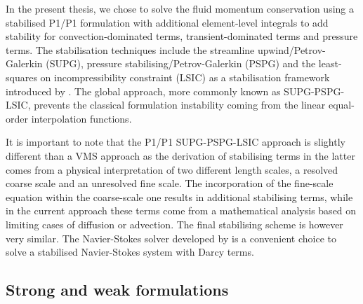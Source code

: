 In the present thesis, we chose to solve the fluid momentum conservation using a stabilised P1/P1 formulation with additional 
element-level integrals to add stability for convection-dominated terms, transient-dominated terms and pressure terms. 
The stabilisation techniques include the streamline upwind/Petrov-Galerkin (SUPG), pressure stabilising/Petrov-Galerkin (PSPG) and
the least-squares on incompressibility constraint (LSIC) as a stabilisation framework introduced by \citet{tezduyar_incompressible_1992}.
The global approach, more commonly known as SUPG-PSPG-LSIC, prevents the classical formulation instability coming from the 
linear equal-order interpolation functions.

It is important to note that the P1/P1 SUPG-PSPG-LSIC approach is slightly different than a VMS approach 
as the derivation of stabilising terms in the latter comes from a physical interpretation of two different 
length scales, a resolved coarse scale and an unresolved fine scale. The incorporation of the fine-scale equation
within the coarse-scale one results in additional stabilising terms, while in the current approach these terms
come from a mathematical analysis based on limiting cases of diffusion or advection. 
The final stabilising scheme is however very similar.
The Navier-Stokes solver developed by \citet{hachem_stabilized_2010,rivaux_simulation_2011} is a convenient choice 
to solve a stabilised Navier-Stokes system with Darcy terms. 

\subsection{Strong and weak formulations}

